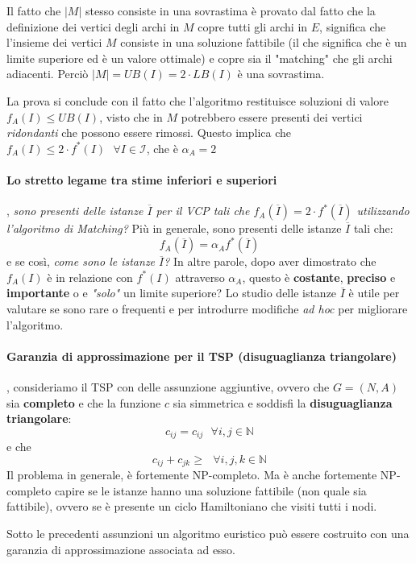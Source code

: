 \documentclass{article}
\begin{document}
Il fatto che $|M|$ stesso consiste in una sovrastima è provato dal fatto che la definizione dei vertici degli
archi in $M$ copre tutti gli archi in $E$, significa che l'insieme dei vertici $M$ consiste in una soluzione
fattibile (il che significa che è un limite superiore ed è un valore ottimale) e copre sia il "matching" che
gli archi adiacenti. Perciò $|M|=UB(I)=2\cdot LB(I)$ è una sovrastima.

La prova si conclude con il fatto che l'algoritmo restituisce soluzioni di valore $f_A(I)\leq UB(I)$, visto che
in $M$ potrebbero essere presenti dei vertici \textit{ridondanti} che possono essere rimossi. Questo
implica che $f_A(I)\leq 2\cdot f^*(I)\text{   }\forall I\in\mathcal{I}$, che è $\alpha_A=2$
\paragraph{Lo stretto legame tra stime inferiori e superiori}, \textit{sono presenti delle istanze $\overline{I}$ per
    il VCP tali che $f_A(\overline{I})=2\cdot f^{*}(\overline{I})$ utilizzando l'algoritmo di Matching?} Più
in generale, sono presenti delle istanze $\overline{I}$ tali che:
$$f_A(\overline{I})=\alpha_A f^*(\overline{I})$$
e se così, \textit{come sono le istanze $\overline{I}$?} In altre parole, dopo aver dimostrato che $f_A(I)$ è
in relazione con $f^*(I)$ attraverso $\alpha_A$, questo è \textbf{costante}, \textbf{preciso} e \textbf{importante}
o e \textit{"solo"} un limite superiore? Lo studio delle istanze $\overline{I}$ è utile per valutare se sono
rare o frequenti e per introdurre modifiche \textit{ad hoc} per migliorare l'algoritmo.
\paragraph{Garanzia di approssimazione per il TSP (disuguaglianza triangolare)}, consideriamo il TSP
con delle assunzione aggiuntive, ovvero che $G=(N,A)$ sia \textbf{completo} e che la funzione $c$ sia
simmetrica e soddisfi la \textbf{disuguaglianza triangolare}:
$$c_{ij}=c_{ij}\text{   }\forall i,j\in\mathbb{N}$$
e che
$$c_{ij}+c_{jk}\geq\text{   }\forall i,j,k\in\mathbb{N}$$
Il problema in generale, è fortemente NP-completo. Ma è anche fortemente NP-completo capire se le istanze
hanno una soluzione fattibile (non quale sia fattibile), ovvero se è presente un ciclo Hamiltoniano che visiti
tutti i nodi.

Sotto le precedenti assunzioni un algoritmo euristico può essere costruito con una garanzia di approssimazione
associata ad esso.
\end{document}
